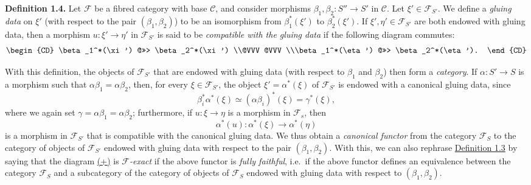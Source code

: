 \documentclass{article}
\newenvironment{rmenv}[1]
  {\phantomsection\par\smallskip\noindent\textbf{#1.}\rmfamily}
  {\par\smallskip}
\newcommand{\oldpage}[1]{\marginpar{\footnotesize$\Big\vert$ \textit{p.~#1}}}
\theoremstyle{definition}
\theoremstyle{definition}
\theoremstyle{definition}
\theoremstyle{definition}
\theoremstyle{remark}
\begin{document}
\leavevmode{}%
\begin{rmenv}{Definition 1.4}
Let \({\mathcal{F}}\) be a fibred category with base \({\mathcal{C}}\), and consider morphisms \(\beta_1,\beta_2\colon S''\to S'\) in \({\mathcal{C}}\).
Let \(\xi'\in{\mathcal{F}}_{S'}\).
We define a \emph{gluing data} on \(\xi'\) (with respect to the pair \((\beta_1,\beta_2)\)) to be an isomorphism from \(\beta_1^*(\xi')\) to \(\beta_2^*(\xi')\).
If \(\xi',\eta'\in{\mathcal{F}}_{S'}\) are both endowed with gluing data, then a morphism \(u\colon\xi'\to\eta'\) in \({\mathcal{F}}_{S'}\) is said to be \emph{compatible with the gluing data} if the following diagram commutes:
\[
  \begin{CD}
    \beta_1^*(\xi') @>>> \beta_2^*(\xi')
  \\@VVV @VVV
  \\\beta_1^*(\eta') @>>> \beta_2^*(\eta').
  \end{CD}
\]

\end{rmenv}

With this definition, the objects of \({\mathcal{F}}_{S'}\) that are endowed with gluing data (with respect to \(\beta_1\) and \(\beta_2\)) then form a \emph{category}.
\oldpage{190-04}If \(\alpha\colon S'\to S\) is a morphism such that \(\alpha\beta_1=\alpha\beta_2\), then, for every \(\xi\in{\mathcal{F}}_{S'}\), the object \(\xi'=\alpha^*(\xi)\) of \({\mathcal{F}}_{S'}\) is endowed with a canonical gluing data, since
\[
  \beta_i^*\alpha^*(\xi)
  \simeq (\alpha\beta_i)^*(\xi)
  = \gamma^*(\xi),
\]
where we again set \(\gamma=\alpha\beta_1=\alpha\beta_2\);
furthermore, if \(u\colon\xi\to\eta\) is a morphism in \({\mathcal{F}}_s\), then
\[
  \alpha^*(u)\colon \alpha^*(\xi) \to \alpha^*(\eta)
\]
is a morphism in \({\mathcal{F}}_{S'}\) that is compatible with the canonical gluing data.
We thus obtain a \emph{canonical functor} from the category \({\mathcal{F}}_S\) to the category of objects of \({\mathcal{F}}_{S'}\) endowed with gluing data with respect to the pair \((\beta_1,\beta_2)\).
With this, we can also rephrase \protect\hyperlink{fga-3-i-section-A.1-definition-1.3}{Definition 1.3} by saying that the diagram \protect\hyperlink{fga-3-i-section-A.1-definition-1.3-equation}{(+)} is \emph{\({\mathcal{F}}\)-exact} if the above functor is \emph{fully faithful}, i.e.~if the above functor defines an equivalence between the category \({\mathcal{F}}_S\) and a subcategory of the category of objects of \({\mathcal{F}}_S\) endowed with gluing data with respect to \((\beta_1,\beta_2)\).
\end{document}
